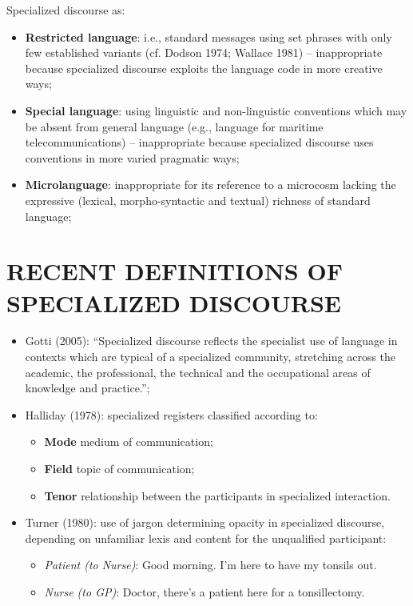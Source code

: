 Specialized discourse as:

\begin{itemize}

\item\textbf{Restricted language}:  i.e., standard messages using set phrases with only few established variants (cf. Dodson 1974; Wallace 1981) – inappropriate because specialized discourse exploits the language code in more creative ways;
\item\textbf{Special language}: using linguistic and non-linguistic conventions which may be absent from general language (e.g., language for maritime telecommunications) – inappropriate because specialized discourse uses conventions in more varied pragmatic ways;
\item\textbf{Microlanguage}: inappropriate for its reference to a microcosm lacking the expressive (lexical, morpho-syntactic and textual) richness of standard language;

\end{itemize}

\section{RECENT DEFINITIONS OF SPECIALIZED DISCOURSE}

\begin{itemize}

\item Gotti (2005): “Specialized discourse reflects the specialist use of language in contexts which are typical of a specialized community, stretching across the academic, the professional, the technical and the occupational areas of knowledge and practice.”;

\item Halliday (1978): specialized registers classified according to:

\begin{itemize}

\item\textbf{Mode} medium of communication;
\item\textbf{Field} topic of communication;
\item\textbf{Tenor} relationship between the participants in specialized interaction.

\end{itemize}

\item Turner (1980): use of jargon determining opacity in specialized discourse, depending on unfamiliar lexis and content for the unqualified participant:
 
\begin{itemize}

\item\textit{Patient (to Nurse)}: Good morning. I’m here to have my tonsils out.
\item\textit{Nurse (to GP)}: Doctor, there’s a patient here for a tonsillectomy.

\end{itemize}

\end{itemize}


